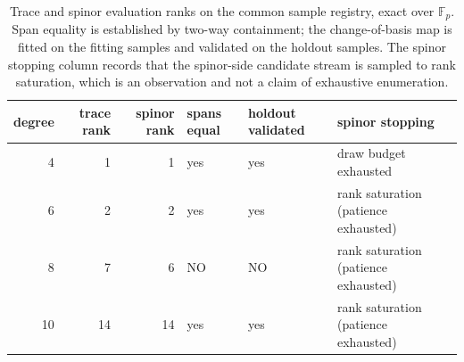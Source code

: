 \begin{table}[t]
\centering
\small
\begin{tabular}{rrrllp{3.4cm}}
\toprule
degree & trace rank & spinor rank & spans equal & holdout validated & spinor stopping \\
\midrule
4 & 1 & 1 & yes & yes & draw budget exhausted \\
6 & 2 & 2 & yes & yes & rank saturation (patience exhausted) \\
8 & 7 & 6 & NO & NO & rank saturation (patience exhausted) \\
10 & 14 & 14 & yes & yes & rank saturation (patience exhausted) \\
\bottomrule
\end{tabular}
\caption{Trace and spinor evaluation ranks on the common sample registry, exact over $\mathbb{F}_p$. Span equality is established by two-way containment; the change-of-basis map is fitted on the fitting samples and validated on the holdout samples. The spinor stopping column records that the spinor-side candidate stream is sampled to rank saturation, which is an observation and not a claim of exhaustive enumeration.
}
\label{tab:comparison}
\end{table}
